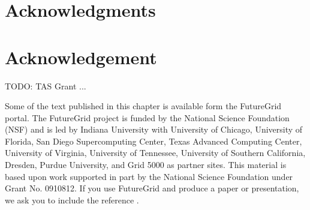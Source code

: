 \documentclass{sig-alternate}
\begin{document}





















\section{Acknowledgments}

\section*{Acknowledgement}

TODO: TAS Grant ... 

Some of the text published in this chapter is available form the
FutureGrid portal. The FutureGrid project is funded by the National
Science Foundation (NSF) and is led by Indiana University with
University of Chicago, University of Florida, San Diego Supercomputing
Center, Texas Advanced Computing Center, University of Virginia,
University of Tennessee, University of Southern California, Dresden,
Purdue University, and Grid 5000 as partner sites. This material is
based upon work supported in part by the National Science Foundation
under Grant No. 0910812. If you use FutureGrid and produce a paper or
presentation, we ask you to include the reference
\cite{las2010gce,las12fg-bookchapter}.

%


\end{document}

